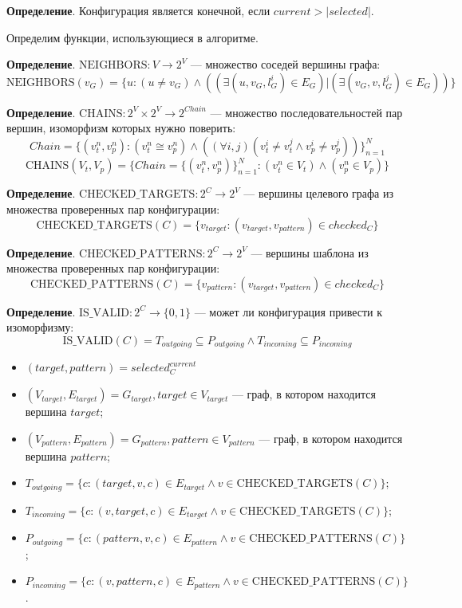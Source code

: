 \textbf{Определение}. Конфигурация является конечной, если $current > |selected|$.

Определим функции, использующиеся в алгоритме.

\textbf{Определение}. $\textrm{NEIGHBORS} : V \to 2^V$ --- множество соседей вершины графа:
%
$$\textrm{NEIGHBORS}(v_G) = \{ u : (u \ne v_G) \land ( ( \exists (u, v_G, l^i_G) \in E_G ) | ( \exists (v_G, v, l^j_G) \in E_G ) ) \}$$

\textbf{Определение}. $\textrm{CHAINS} : 2^V \times 2^V \to 2^{Chain}$ --- множество последовательностей пар вершин, изоморфизм которых нужно поверить:
%
$$Chain = \{ ( v^n_t, v^n_p ) : ( v^n_t \cong v^n_p ) \land ( ( \forall i, j ) ( v^i_t \ne v^j_t \land v^i_p \ne v^j_p ) ) \}_{n = 1}^N$$
%
$$\textrm{CHAINS}(V_t, V_p) = \{ Chain = \{ ( v^n_t, v^n_p ) \}_{n = 1}^N : ( v^n_t \in V_t ) \land ( v^n_p \in V_p ) \}$$

\textbf{Определение}. $\textrm{CHECKED\_TARGETS} : 2^C \to 2^V$ --- вершины целевого графа из множества проверенных пар конфигурации:
%
$$\textrm{CHECKED\_TARGETS}(C) = \{ v_{target} : ( v_{target}, v_{pattern} ) \in checked_C \}$$

\textbf{Определение}. $\textrm{CHECKED\_PATTERNS} : 2^C \to 2^V$ --- вершины шаблона из множества проверенных пар конфигурации:
%
$$\textrm{CHECKED\_PATTERNS}(C) = \{ v_{pattern} : ( v_{target}, v_{pattern} ) \in checked_C \}$$

\textbf{Определение}. $\textrm{IS\_VALID} : 2^C \to \{ 0, 1 \}$ --- может ли конфигурация привести к изоморфизму:
%
$$\textrm{IS\_VALID}(C) = T_{outgoing} \subseteq P_{outgoing} \land T_{incoming} \subseteq P_{incoming} $$
%
\begin{itemize}
\item $(target, pattern) = selected^{current}_C$
\item $(V_{target}, E_{target}) = G_{target}, target \in V_{target}$ --- граф, в котором находится вершина $target$;
\item $(V_{pattern}, E_{pattern}) = G_{pattern}, pattern \in V_{pattern}$ --- граф, в котором находится вершина $pattern$;
\item $T_{outgoing} = \{ c : ( target, v, c ) \in E_{target} \land v \in \textrm{CHECKED\_TARGETS}(C) \} $;
\item $T_{incoming} = \{ c : ( v, target, c ) \in E_{target} \land v \in \textrm{CHECKED\_TARGETS}(C) \} $;
\item $P_{outgoing} = \{ c : ( pattern, v, c ) \in E_{pattern} \land v \in \textrm{CHECKED\_PATTERNS}(C) \} $;
\item $P_{incoming} = \{ c : ( v, pattern, c ) \in E_{pattern} \land v \in \textrm{CHECKED\_PATTERNS}(C) \} $.
\end{itemize}

